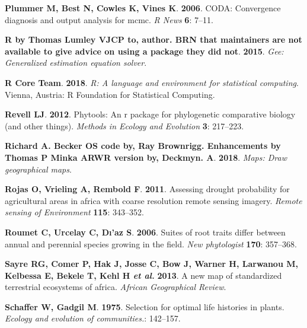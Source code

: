 \documentclass[man,floatsintext]{apa6}
\theoremstyle{definition}
\theoremstyle{definition}
\theoremstyle{definition}
\theoremstyle{remark}
\begin{document}
\leavevmode\hypertarget{ref-R-coda}{}%
\textbf{\textnormal{Plummer M}, \textnormal{Best N}, \textnormal{Cowles
K}, \textnormal{Vines K}}. \textbf{2006}. CODA: Convergence diagnosis
and output analysis for mcmc. \emph{R News} \textbf{6}: 7--11.

\leavevmode\hypertarget{ref-R-gee}{}%
\textbf{\textnormal{R by Thomas Lumley VJCP to}, \textnormal{author. BRN
that maintainers are not available to give advice on using a package
they did not}}. \textbf{2015}. \emph{Gee: Generalized estimation
equation solver}.

\leavevmode\hypertarget{ref-R-base}{}%
\textbf{\textnormal{R Core Team}}. \textbf{2018}. \emph{R: A language
and environment for statistical computing}. Vienna, Austria: R
Foundation for Statistical Computing.

\leavevmode\hypertarget{ref-R-phytools}{}%
\textbf{\textnormal{Revell LJ}}. \textbf{2012}. Phytools: An r package
for phylogenetic comparative biology (and other things). \emph{Methods
in Ecology and Evolution} \textbf{3}: 217--223.

\leavevmode\hypertarget{ref-R-maps}{}%
\textbf{\textnormal{Richard A. Becker OS code by}, \textnormal{Ray
Brownrigg. Enhancements by Thomas P Minka ARWR version by},
\textnormal{Deckmyn. A}}. \textbf{2018}. \emph{Maps: Draw geographical
maps}.

\leavevmode\hypertarget{ref-rojas2011assessing}{}%
\textbf{\textnormal{Rojas O}, \textnormal{Vrieling A},
\textnormal{Rembold F}}. \textbf{2011}. Assessing drought probability
for agricultural areas in africa with coarse resolution remote sensing
imagery. \emph{Remote sensing of Environment} \textbf{115}: 343--352.

\leavevmode\hypertarget{ref-roumet2006suites}{}%
\textbf{\textnormal{Roumet C}, \textnormal{Urcelay C}, \textnormal{Dı'az
S}}. \textbf{2006}. Suites of root traits differ between annual and
perennial species growing in the field. \emph{New phytologist}
\textbf{170}: 357--368.

\leavevmode\hypertarget{ref-sayre2013new}{}%
\textbf{\textnormal{Sayre RG}, \textnormal{Comer P}, \textnormal{Hak J},
\textnormal{Josse C}, \textnormal{Bow J}, \textnormal{Warner H},
\textnormal{Larwanou M}, \textnormal{Kelbessa E}, \textnormal{Bekele T},
\textnormal{Kehl H} \emph{et al.}} \textbf{2013}. A new map of
standardized terrestrial ecosystems of africa. \emph{African
Geographical Review}.

\leavevmode\hypertarget{ref-schaffer1975selection}{}%
\textbf{\textnormal{Schaffer W}, \textnormal{Gadgil M}}. \textbf{1975}.
Selection for optimal life histories in plants. \emph{Ecology and
evolution of communities.}: 142--157.
\end{document}

